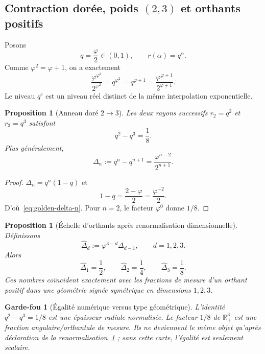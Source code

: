 \documentclass[11pt,a4paper]{article}
\newtheorem{proposition}[theorem]{Proposition}
\newtheorem{guardrail}[theorem]{Garde-fou}
\newcommand{\R}{\mathbb R}
\newcommand{\ph}{\varphi}
\begin{document}
\subsection{Contraction dorée, poids $(2,3)$ et orthants positifs}\label{subsec:golden-A2-weights}

Posons
\[
 q=\frac{\ph}{2}\in(0,1),\qquad r(\alpha)=q^\alpha.
\]
Comme $\ph^2=\ph+1$, on a exactement
\[
 \frac{\ph^{\ph^2}}{2^{\ph^2}}=q^{\ph^2}=q^{\ph+1}=
 \frac{\ph^{\ph+1}}{2^{\ph+1}}.
\]
Le niveau $q^e$ est un niveau réel distinct de la même interpolation exponentielle.

\begin{proposition}[Anneau doré $2\to3$]\label{prop:q2q3-eighth}
Les deux rayons successifs $r_2=q^2$ et $r_3=q^3$ satisfont
\begin{equation}\label{eq:q2q3-eighth}
 \boxed{q^2-q^3=\frac18.}
\end{equation}
Plus généralement,
\begin{equation}\label{eq:golden-delta-n}
 \Delta_n:=q^n-q^{n+1}=\frac{\ph^{n-2}}{2^{n+1}}.
\end{equation}
\end{proposition}

\begin{proof}
$\Delta_n=q^n(1-q)$ et
\[
 1-q=\frac{2-\ph}{2}=\frac{\ph^{-2}}2.
\]
D'où~\eqref{eq:golden-delta-n}. Pour $n=2$, le facteur $\ph^{0}$ donne $1/8$.
\end{proof}

\begin{proposition}[Échelle d'orthants après renormalisation dimensionnelle]\label{prop:orthant-golden-ladder}
Définissons
\[
 \widehat\Delta_d:=\ph^{3-d}\Delta_{d-1},\qquad d=1,2,3.
\]
Alors
\[
 \boxed{\widehat\Delta_1=\frac12,\qquad
 \widehat\Delta_2=\frac14,\qquad
 \widehat\Delta_3=\frac18.}
\]
Ces nombres coïncident exactement avec les fractions de mesure d'un orthant positif dans une géométrie signée symétrique en dimensions $1,2,3$.
\end{proposition}

\begin{guardrail}[Égalité numérique versus type géométrique]
L'identité $q^2-q^3=1/8$ est une \emph{épaisseur radiale normalisée}. Le facteur $1/8$ de $\R_+^3$ est une \emph{fraction angulaire/orthantale} de mesure. Ils ne deviennent le même objet qu'après déclaration de la renormalisation~\ref{prop:orthant-golden-ladder} ; sans cette carte, l'égalité est seulement scalaire.
\end{guardrail}
\end{document}
